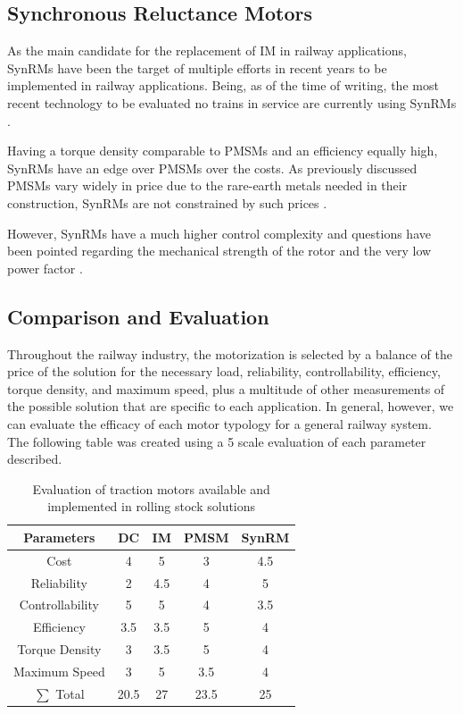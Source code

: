 \subsection{Synchronous Reluctance Motors}
As the main candidate for the replacement of IM in railway applications, SynRMs have been the target of multiple efforts in recent years to be implemented in railway applications. Being, as of the time of writing, the most recent technology to be evaluated no trains in service are currently using SynRMs \cite{Motor-SOTA}.

Having a torque density comparable to PMSMs and an efficiency equally high, SynRMs have an edge over PMSMs over the costs. As previously discussed PMSMs vary widely in price due to the rare-earth metals needed in their construction, SynRMs are not constrained by such prices \cite{MainSOTA}.

However, SynRMs have a much higher control complexity and questions have been pointed regarding the mechanical strength of the rotor and the very low power factor \cite{Motor-SOTA}.

\subsection{Comparison and Evaluation}
Throughout the railway industry, the motorization is selected by a balance of the price of the solution for the necessary load, reliability, controllability, efficiency, torque density, and maximum speed, plus a multitude of other measurements of the possible solution that are specific to each application. In general, however, we can evaluate the efficacy of each motor typology for a general railway system. The following table was created \cite{MainSOTA} using a 5 scale evaluation of each parameter described. 

\begin{table}[ht]

    \centering
    \caption{Evaluation of traction motors available and implemented in rolling stock solutions}
    \begin{tabular}{c|c c c c}
        \hline\hline
        Parameters     & DC & IM & PMSM & SynRM \\
        \hline
         Cost & 4 & 5 & 3 & 4.5\\
         Reliability & 2 & 4.5 & 4 & 5\\
         Controllability & 5 & 5 & 4 & 3.5\\
         Efficiency & 3.5 & 3.5 & 5 & 4\\
         Torque Density & 3 & 3.5 & 5 & 4\\
         Maximum Speed & 3 & 5 & 3.5 & 4\\
         \hline
         $\sum $ Total & 20.5 & 27 & 23.5 & 25\\
         \hline\hline
    \end{tabular}
    
    \label{tab:MotorEval}
\end{table}

